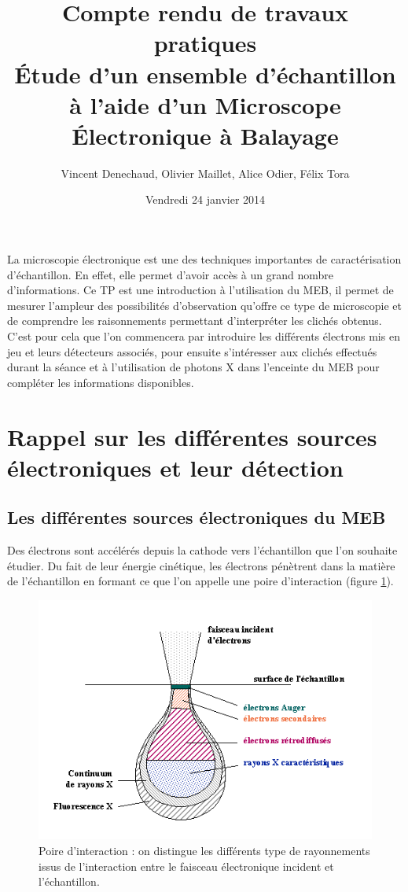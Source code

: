 \documentclass[a4paper,12pt]{article}
\title{\Large Compte rendu de travaux pratiques\\ Étude d'un ensemble d'échantillon à l'aide d'un Microscope Électronique à Balayage}
\author{Vincent Denechaud, Olivier Maillet, Alice Odier, Félix Tora}
\date{Vendredi 24 janvier 2014}
\begin{document}
\maketitle


\vfill

\tableofcontents

\newpage


La microscopie électronique est une des techniques importantes de caractérisation d'échantillon. En effet, elle permet d'avoir accès à un grand nombre d'informations. Ce TP est une introduction à l'utilisation du MEB, il permet de mesurer l'ampleur des possibilités d'observation qu'offre ce type de microscopie et de comprendre les raisonnements permettant d'interpréter les clichés obtenus. C'est pour cela que l'on commencera par introduire les différents électrons mis en jeu et leurs détecteurs associés, pour ensuite s'intéresser aux clichés effectués durant la séance et à l'utilisation de photons X dans l'enceinte du MEB pour compléter les informations disponibles.



\section{Rappel sur les différentes sources électroniques et leur détection}


\subsection{Les différentes sources électroniques du MEB}

Des électrons sont accélérés depuis la cathode vers l'échantillon que l'on souhaite étudier. Du fait de leur énergie cinétique, les électrons pénètrent dans la matière de l'échantillon en formant ce que l'on appelle une poire d'interaction (figure \ref{fig:poire_int}).

\begin{figure}[h]
\centering
\includegraphics[width = 0.8 \textwidth]{images/poire_int.png}
\caption{Poire d'interaction : on distingue les différents type de rayonnements issus de l'interaction entre le faisceau électronique incident et l'échantillon.}
\label{fig:poire_int}
\end{figure}
\end{document}
